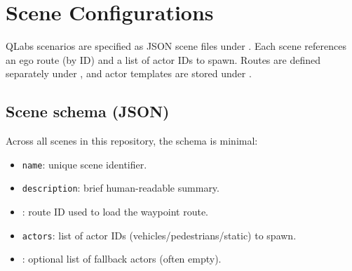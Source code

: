 \chapter{Scene Configurations}
\label{app:scene-configs}

QLabs scenarios are specified as JSON scene files under . Each scene references an ego route (by ID) and a list of actor IDs to spawn. Routes are defined separately under , and actor templates are stored under .

\section{Scene schema (JSON)}
Across all scenes in this repository, the schema is minimal:
\begin{itemize}[leftmargin=*]
  \item \texttt{name}: unique scene identifier.
  \item \texttt{description}: brief human-readable summary.
  \item \texttt{}: route ID used to load the waypoint route.
  \item \texttt{actors}: list of actor IDs (vehicles/pedestrians/static) to spawn.
  \item \texttt{}: optional list of fallback actors (often empty).
\end{itemize}

